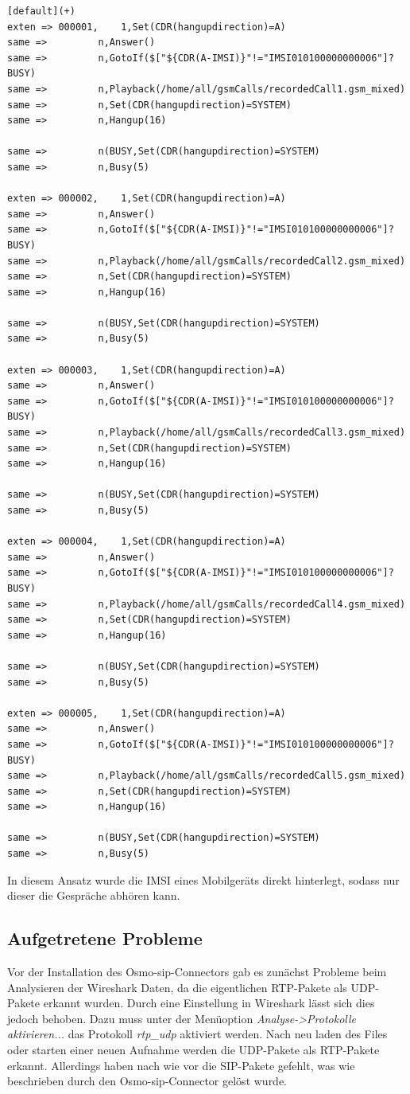 \begin{lstlisting}
[default](+)
exten => 000001,	1,Set(CDR(hangupdirection)=A)
same =>			n,Answer()
same =>			n,GotoIf($["${CDR(A-IMSI)}"!="IMSI010100000000006"]?BUSY)
same =>			n,Playback(/home/all/gsmCalls/recordedCall1.gsm_mixed)
same =>			n,Set(CDR(hangupdirection)=SYSTEM)
same =>			n,Hangup(16)

same =>			n(BUSY,Set(CDR(hangupdirection)=SYSTEM)
same =>			n,Busy(5)

exten => 000002,	1,Set(CDR(hangupdirection)=A)
same =>			n,Answer()
same =>			n,GotoIf($["${CDR(A-IMSI)}"!="IMSI010100000000006"]?BUSY)
same =>			n,Playback(/home/all/gsmCalls/recordedCall2.gsm_mixed)
same =>			n,Set(CDR(hangupdirection)=SYSTEM)
same =>			n,Hangup(16)

same =>			n(BUSY,Set(CDR(hangupdirection)=SYSTEM)
same =>			n,Busy(5)

exten => 000003,	1,Set(CDR(hangupdirection)=A)
same =>			n,Answer()
same =>			n,GotoIf($["${CDR(A-IMSI)}"!="IMSI010100000000006"]?BUSY)
same =>			n,Playback(/home/all/gsmCalls/recordedCall3.gsm_mixed)
same =>			n,Set(CDR(hangupdirection)=SYSTEM)
same =>			n,Hangup(16)

same =>			n(BUSY,Set(CDR(hangupdirection)=SYSTEM)
same =>			n,Busy(5)

exten => 000004,	1,Set(CDR(hangupdirection)=A)
same =>			n,Answer()
same =>			n,GotoIf($["${CDR(A-IMSI)}"!="IMSI010100000000006"]?BUSY)
same =>			n,Playback(/home/all/gsmCalls/recordedCall4.gsm_mixed)
same =>			n,Set(CDR(hangupdirection)=SYSTEM)
same =>			n,Hangup(16)

same =>			n(BUSY,Set(CDR(hangupdirection)=SYSTEM)
same =>			n,Busy(5)

exten => 000005,	1,Set(CDR(hangupdirection)=A)
same =>			n,Answer()
same =>			n,GotoIf($["${CDR(A-IMSI)}"!="IMSI010100000000006"]?BUSY)
same =>			n,Playback(/home/all/gsmCalls/recordedCall5.gsm_mixed)
same =>			n,Set(CDR(hangupdirection)=SYSTEM)
same =>			n,Hangup(16)

same =>			n(BUSY,Set(CDR(hangupdirection)=SYSTEM)
same =>			n,Busy(5)
\end{lstlisting}

In diesem Ansatz wurde die IMSI eines Mobilgeräts direkt hinterlegt, sodass nur dieser die Gespräche abhören kann. 






\subsection{Aufgetretene Probleme}
Vor der Installation des Osmo-sip-Connectors gab es zunächst Probleme beim Analysieren der Wireshark Daten, da die eigentlichen RTP-Pakete als UDP-Pakete erkannt wurden. Durch eine Einstellung in Wireshark lässt sich dies jedoch behoben. Dazu muss unter der Menüoption \textit{Analyse->Protokolle aktivieren...} das Protokoll \textit{rtp\_udp} aktiviert werden. Nach neu laden des Files oder starten einer neuen Aufnahme werden die UDP-Pakete als RTP-Pakete erkannt. Allerdings haben nach wie vor die SIP-Pakete gefehlt, was wie beschrieben durch den Osmo-sip-Connector gelöst wurde.\\


